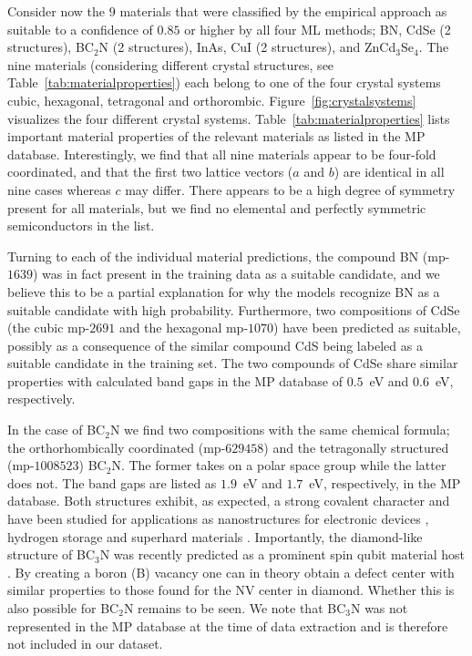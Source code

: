 \documentclass[superscriptaddress,unsortedaddress,
 amsmath,amssymb,
 aps,
]{revtex4-2}
\begin{document}
Consider now the $9$ materials that were classified by the empirical approach as suitable to a confidence of $0.85$ or higher by all four ML methods; BN, CdSe (2 structures), BC$_2$N (2 structures), InAs, CuI (2 structures), and ZnCd$_3$Se$_4$. 
The nine materials (considering different crystal structures, see Table~\ref{tab:materialproperties}) each belong to one of the four crystal systems cubic, hexagonal, tetragonal and orthorombic. Figure~\ref{fig:crystalsystems} visualizes the four different crystal systems. Table~\ref{tab:materialproperties} lists important material properties of the relevant materials as listed in the MP database.  Interestingly, we find that all nine materials appear to be four-fold coordinated, and that the first two lattice vectors ($a$ and $b$) are identical in all nine cases whereas $c$ may differ.  
There appears to be a high degree of symmetry present for all materials, but we find no elemental and perfectly symmetric semiconductors in the list. 


Turning to each of the individual material predictions, the compound BN (mp-$1639$) was in fact present in the training data as a suitable candidate, and we believe this to be a partial explanation for why the models recognize BN as a suitable candidate with high probability. Furthermore, two compositions of CdSe (the cubic mp-$2691$ and the hexagonal mp-$1070$) have been predicted as suitable, possibly as a consequence of the similar compound CdS being labeled as a suitable candidate in the training set. 
The two compounds of CdSe share similar properties with calculated band gaps in the MP database of $0.5$~eV and $0.6$~eV, respectively. 


In the case of BC$_2$N we find two compositions with the same chemical formula; the orthorhombically coordinated (mp-$629458$) and the tetragonally structured (mp-$1008523$) BC$_2$N. The former takes on a polar space group while the latter does not. The band gaps are listed as $1.9$~eV and $1.7$~eV, respectively, in the MP database. 
Both structures exhibit, as expected, a strong covalent character and have been studied for applications as nanostructures for electronic devices \cite{Gao2017}, hydrogen storage \cite{Cai2017} and superhard materials \cite{Li2017, Jiang2020}. Importantly, the diamond-like structure of BC$_3$N was recently predicted as a prominent spin qubit material host \cite{Wang2020SpinQB}. By creating a boron (B) vacancy one can in theory obtain a defect center with similar properties to those found for the NV center in diamond. Whether this is also possible for BC$_2$N remains to be seen. We note that BC$_3$N was not represented in the MP database at the time of data extraction and is therefore not included in our dataset. 
\end{document}
